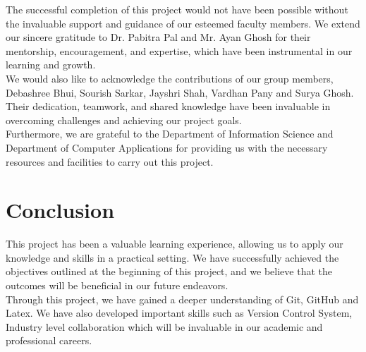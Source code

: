 \documentclass[a4paper,12pt]{article}
\begin{document}
The successful completion of this project would not have been possible without the invaluable support and guidance of our esteemed faculty members. We extend our sincere gratitude to Dr. Pabitra Pal and Mr. Ayan Ghosh for their mentorship, encouragement, and expertise, which have been instrumental in our learning and growth.\\

We would also like to acknowledge the contributions of our group members, Debashree Bhui, Sourish Sarkar, Jayshri Shah, Vardhan Pany and Surya Ghosh. Their dedication, teamwork, and shared knowledge have been invaluable in overcoming challenges and achieving our project goals.\\

Furthermore, we are grateful to the Department of Information Science and Department of Computer Applications for providing us with the necessary resources and facilities to carry out this project.

\section{Conclusion}

This project has been a valuable learning experience, allowing us to apply our knowledge and skills in a practical setting. We have successfully achieved the objectives outlined at the beginning of this project, and we believe that the outcomes will be beneficial in our future endeavors.\\

Through this project, we have gained a deeper understanding of Git, GitHub and Latex. We have also developed important skills such as Version Control System, Industry level collaboration which will be invaluable in our academic and professional careers.
\end{document}
